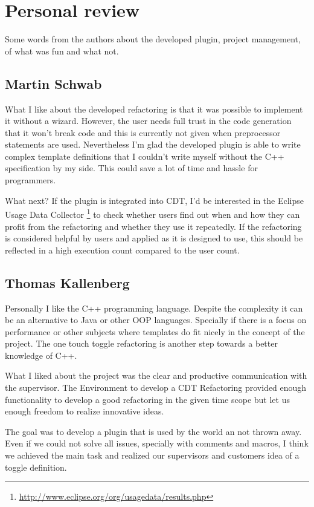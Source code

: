 \section{Personal review}

Some words from the authors about the developed plugin, project management, of 
what was fun and what not.

\subsection{Martin Schwab}

What I like about the developed refactoring is that it was possible to implement 
it without a wizard. However, the user needs full trust in the code generation 
that it won't break code and this is currently not given when preprocessor 
statements are used. Nevertheless I'm glad the developed plugin is able to write 
complex template definitions that I couldn't write myself without the C++ 
specification by my side. This could save a lot of time and hassle for 
programmers.

What next? If the plugin is integrated into CDT, I'd be interested in the 
Eclipse Usage Data Collector
\footnote{\url{http://www.eclipse.org/org/usagedata/results.php}} to check 
whether users find out when and how they can profit from the refactoring and 
whether they use it repeatedly. If the refactoring is considered helpful by 
users and applied as it is designed to use, this should be reflected in a high 
execution count compared to the user count.

\subsection{Thomas Kallenberg}

Personally I like the C++ programming language. Despite the complexity it can
be an alternative to Java or other OOP languages. Specially if there is a focus
on performance or other subjects where templates do fit nicely in the concept
of the project.
The one touch toggle refactoring is another step towards a better knowledge of
C++.

What I liked about the project was the clear and productive communication with
the supervisor. The Environment to develop a CDT Refactoring provided enough
functionality to develop a good refactoring in the given time scope but let us
enough freedom to realize innovative ideas.

The goal was to develop a plugin that is used by the world an not thrown away.
Even if we could not solve all issues, specially with comments and macros, I
think we achieved the main task and realized our supervisors and customers 
idea of a toggle definition.

